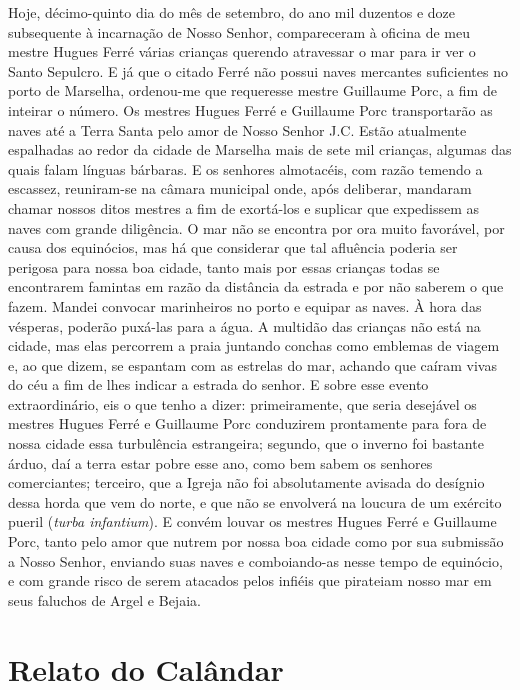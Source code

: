 Hoje, décimo-quinto dia do mês de setembro, do ano mil duzentos e doze
subsequente à incarnação de Nosso Senhor, compareceram à oficina de meu
mestre Hugues Ferré várias crianças querendo atravessar o mar para ir ver
o Santo Sepulcro. E já que o citado Ferré não possui naves mercantes
suficientes no porto de Marselha, ordenou-me que requeresse mestre
Guillaume Porc, a fim de inteirar o número. Os mestres Hugues Ferré e
Guillaume Porc transportarão as naves até a Terra Santa pelo amor de Nosso
Senhor J.C. Estão atualmente espalhadas ao redor da cidade de Marselha
mais de sete mil crianças, algumas das quais falam línguas bárbaras. E os
senhores almotacéis, com razão temendo a escassez, reuniram-se na câmara
municipal onde, após deliberar, mandaram chamar nossos ditos mestres a fim
de exortá-los e suplicar que expedissem as naves com grande diligência. O
mar não se encontra por ora muito favorável, por causa dos equinócios, mas
há que considerar que tal afluência poderia ser perigosa para nossa boa
cidade, tanto mais por essas crianças todas se encontrarem famintas em
razão da distância da estrada e por não saberem o que fazem. Mandei
convocar marinheiros no porto e equipar as naves. À hora das vésperas,
poderão puxá-las para a água. A multidão das crianças não está na cidade,
mas elas percorrem a praia juntando conchas como emblemas de viagem e, ao
que dizem, se espantam com as estrelas do mar, achando que caíram vivas do
céu a fim de lhes indicar a estrada do senhor. E sobre esse evento
extraordinário, eis o que tenho a dizer: primeiramente, que seria
desejável os mestres Hugues Ferré e Guillaume Porc conduzirem prontamente
para fora de nossa cidade essa turbulência estrangeira; segundo, que o
inverno foi bastante árduo, daí a terra estar pobre esse ano, como bem
sabem os senhores comerciantes; terceiro, que a Igreja não foi
absolutamente avisada do desígnio dessa horda que vem do norte, e que não
se envolverá na loucura de um exército pueril (\textit{turba infantium}).
E convém louvar os mestres Hugues Ferré e Guillaume Porc, tanto pelo amor
que nutrem por nossa boa cidade como por sua submissão a Nosso Senhor,
enviando suas naves e comboiando-as nesse tempo de equinócio, e com grande
risco de serem atacados pelos infiéis que pirateiam nosso mar em seus
faluchos de Argel e Bejaia.

\chapter{Relato do Calândar}


